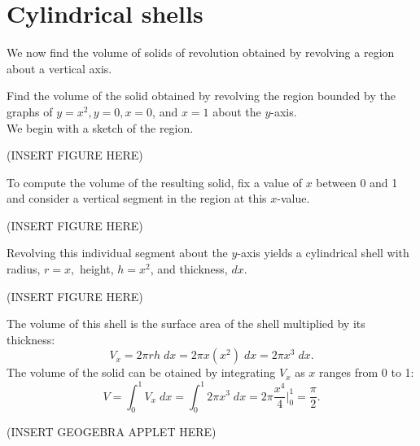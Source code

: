 \documentclass{ximera}
\begin{document}
\section{Cylindrical shells}


We now find the volume of solids of revolution obtained by revolving a region about a vertical axis.

\begin{example} Find the volume of the solid obtained by revolving the region bounded by the graphs of $y = x^2, y=0, x=0$, and $x = 1$ about the $y$-axis.\\
We begin with a sketch of the region.

(INSERT FIGURE HERE)

To compute the volume of the resulting solid, fix a value of $x$ between 0 and 1 and consider a vertical segment in the region at this $x$-value.

(INSERT FIGURE HERE)

Revolving this individual segment about the $y$-axis yields a cylindrical shell with radius, $r = x,$ height, $h = x^2$, and thickness, $dx$. 

(INSERT FIGURE HERE)

The volume of this shell is the surface area of the shell multiplied by its thickness:
\[
V_x = 2\pi rh \;dx = 2\pi x(x^2) \; dx = 2\pi x^3 \; dx.
\]
The volume of the solid can be otained by integrating $V_x$ as $x$ ranges from 0 to 1:
\[
V = \int_0^1 V_x \; dx = \int_0^1 2\pi x^3 \; dx = 2\pi \frac{x^4}{4}\bigg|_0^1 = \frac{\pi}{2}.
\]


(INSERT GEOGEBRA APPLET HERE)

\end{example}
\end{document}
